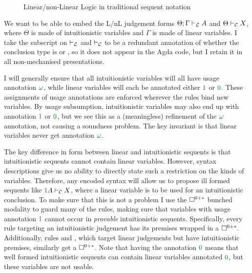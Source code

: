 \begin{figure}
  \caption{Linear/non-Linear Logic in traditional sequent notation}
  \label{fig:LnL-orig}
\end{figure}

We want to be able to embed the L/nL judgement forms
$\Theta; \Gamma \mathrel{\vdash_{\mathcal L}} A$ and $\Theta \mathrel{\vdash_{\mathcal C}} X$, where
$\Theta$ is made of intuitionistic variables and $\Gamma$ is made of linear
variables.
I take the subscript on $\mathrel{\vdash_{\mathcal L}}$ and $\mathrel{\vdash_{\mathcal C}}$ to be a redundant annotation of
whether the conclusion type is  or
, so it does not appear in the Agda code, but I
retain it in all non-mechanised presentations.

I will generally ensure that all intuitionistic variables will all have usage
annotation $\gr\omega$, while linear variables will each be annotated
either $\gr1$ or $\gr0$.
These assignments of usage annotations are enforced wherever the rules bind new
variables.
By usage subsumption, intuitionistic variables may also end up with annotation
$\gr1$ or $\gr0$, but we see this as a (meaningless) refinement of the
$\gr\omega$ annotation, not causing a soundness problem.
The key invariant is that linear variables never get annotation $\gr\omega$.

The key difference in form between linear and intuitionistic sequents is that
intuitionistic sequents cannot contain linear variables.
However, syntax descriptions give us no ability to directly state such a
restriction on the kinds of variables.
Therefore, any encoded syntax will allow us to propose ill formed sequents like
$\gr1A \vdashC X$, where a linear variable is to be used for an intuitionistic
conclusion.
To make sure that this is not a problem I use the $\Box^{0{+}{*}}$ bunched modality to
guard many of the rules, making sure that variables with usage annotation $\gr1$
cannot occur in \emph{provable} intuitionistic sequents.
Specifically, every rule targeting an intuitionistic judgement has its premises
wrapped in a $\Box^{0{+}{*}}$.
Additionally, rules  and , which target linear
judgements but have intuitionistic premises, similarly get a $\Box^{0{+}{*}}$.
Note that having the annotation $\gr0$ means that well formed intuitionistic
sequents can contain linear variables annotated $\gr0$, but these variables are
not usable.

